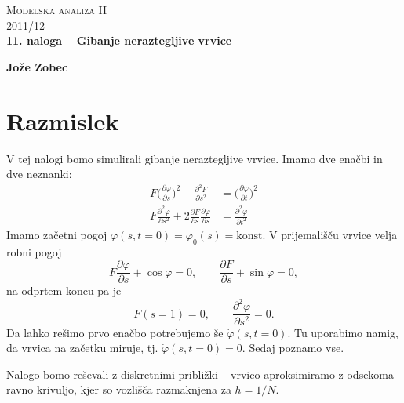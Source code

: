 \documentclass[a4 paper, 12pt]{article}
\begin{document}
\begin{center}
\textsc{Modelska analiza II}\\
\textsc{2011/12}\\[0.5cm]
\textbf{11. naloga -- Gibanje neraztegljive vrvice}
\end{center}
\begin{flushright}
\textbf{Jože Zobec}\\
\end{flushright}

\section{Razmislek}

V tej nalogi bomo simulirali gibanje neraztegljive vrvice. Imamo dve ena\v cbi in dve neznanki:
\begin{align}
    F \bigg(\frac{\partial\varphi}{\partial s}\bigg)^2 - \frac{\partial^2 F}{\partial s^2} &=
        \bigg(\frac{\partial\varphi}{\partial t}\bigg)^2 \\
    F\frac{\partial^2\varphi}{\partial s^2} + 2\frac{\partial F}{\partial s}\frac{\partial \varphi}{\partial s} &=
        \frac{\partial^2 \varphi}{\partial t^2}
\end{align}
Imamo za\v cetni pogoj $\varphi (s,t = 0) = \varphi_0 (s) = \text{konst}$. V prijemali\v s\v cu vrvice
velja robni pogoj
\[
    F \frac{\partial \varphi}{\partial s} + \cos \varphi = 0,
        \qquad \frac{\partial F}{\partial s} + \sin \varphi = 0,
\]
na odprtem koncu pa je
\[
    F (s = 1) = 0, \qquad \frac{\partial^2 \varphi}{\partial s^2} = 0.
\]
Da lahko re\v simo prvo ena\v cbo potrebujemo \v se $\dot{\varphi}(s,t = 0)$. Tu uporabimo namig,
da vrvica na za\v cetku miruje, tj. $\dot{\varphi}(s, t = 0) = 0$. Sedaj poznamo vse.

Nalogo bomo re\v sevali z diskretnimi pribli\v zki -- vrvico aproksimiramo z odsekoma ravno krivuljo,
kjer so vozli\v s\v ca razmaknjena za $h = 1/N$.
\end{document}

